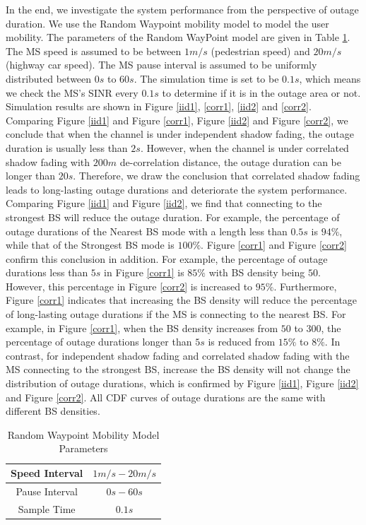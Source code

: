  \par In the end, we investigate the system performance from the perspective of outage duration. We use the Random Waypoint mobility model to model the user mobility. The parameters of the Random WayPoint model are given in Table \ref{RWP}. The MS speed is assumed to be between $1m/s$ (pedestrian speed) and $20m/s$ (highway car speed). The MS pause interval is assumed to be uniformly distributed between $0s$ to $60s$. The simulation time is set to be $0.1s$, which means we check the MS's SINR every $0.1s$ to determine if it is in the outage area or not. Simulation results are shown in Figure \ref{iid1}, \ref{corr1}, \ref{iid2} and \ref{corr2}. Comparing Figure \ref{iid1} and Figure \ref{corr1}, Figure \ref{iid2} and Figure \ref{corr2}, we conclude that when the channel is under independent shadow fading, the outage duration is usually less than $2s$. However,  when the channel is under correlated shadow fading with $200m$ de-correlation distance, the outage duration can be longer than $20s$. Therefore, we draw the conclusion that correlated shadow fading leads to long-lasting outage durations and deteriorate the system performance. Comparing Figure \ref{iid1} and Figure \ref{iid2}, we find that connecting to the strongest BS will reduce the outage duration. For example, the percentage of outage durations of the Nearest BS mode with a length less than $0.5s$ is $94\%$, while that of the Strongest BS mode is $100\%$.  Figure \ref{corr1} and Figure \ref{corr2} confirm this conclusion in addition. For example, the percentage of outage durations less than $5s$ in Figure \ref{corr1} is $85\%$ with BS density being $50$. However, this percentage in Figure \ref{corr2} is increased to $95\%$. Furthermore, Figure \ref{corr1} indicates that increasing the BS density will reduce the percentage of long-lasting outage durations if the MS is connecting to the nearest BS. For example, in Figure \ref{corr1}, when the BS density increases from $50$ to $300$, the percentage of outage durations longer than $5s$ is reduced from $15\%$ to $8\%$. In contrast, for independent shadow fading and correlated shadow fading with the MS connecting to the strongest BS, increase the BS density will not change the distribution of outage durations, which is confirmed by Figure \ref{iid1}, Figure \ref{iid2} and Figure \ref{corr2}. All CDF curves of outage durations are the same with different BS densities. 
 \begin{table}
 \centering
 \caption{\label{RWP}Random Waypoint Mobility Model Parameters}

 \begin{tabular}{|c|c|}

 \hline
 Speed Interval & $1m/s - 20m/s$\\
 \hline
 Pause Interval & $0s - 60s$\\
 \hline
 Sample Time & $0.1s$\\
 \hline
 \end{tabular}

 \end{table}

